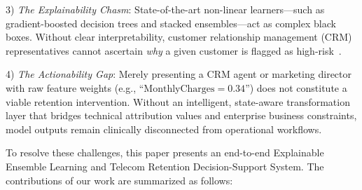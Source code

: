 \documentclass[conference]{IEEEtran}
\begin{document}
3) \textit{The Explainability Chasm}: State-of-the-art non-linear learners---such as gradient-boosted decision trees and stacked ensembles---act as complex black boxes. Without clear interpretability, customer relationship management (CRM) representatives cannot ascertain \textit{why} a given customer is flagged as high-risk~\cite{guidotti2018survey}.

4) \textit{The Actionability Gap}: Merely presenting a CRM agent or marketing director with raw feature weights (e.g., ``$\text{MonthlyCharges} = 0.34$'') does not constitute a viable retention intervention. Without an intelligent, state-aware transformation layer that bridges technical attribution values and enterprise business constraints, model outputs remain clinically disconnected from operational workflows.

To resolve these challenges, this paper presents an end-to-end Explainable Ensemble Learning and Telecom Retention Decision-Support System. The contributions of our work are summarized as follows:
\end{document}
